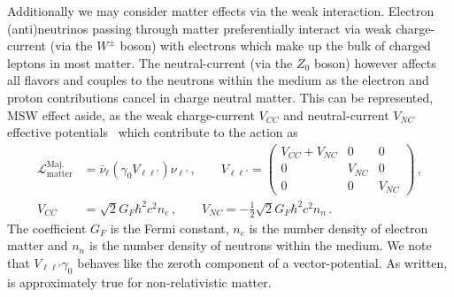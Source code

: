 Additionally we may consider matter effects via the weak interaction. Electron (anti)neutrinos passing through matter preferentially interact via weak charge-current (via the $W^{\pm}$ boson) with electrons which make up the bulk of charged leptons in most matter. The neutral-current (via the $Z_{0}$ boson) however affects all flavors and couples to the neutrons within the medium as the electron and proton contributions cancel in charge neutral matter. This can be represented, MSW effect aside, as the weak charge-current $V_{CC}$ and neutral-current $V_{NC}$ effective potentials~\citep{Pal:1991pm,greiner2009gauge} which contribute to the action as
\begin{align}
\label{matter:1}
\mathcal{L}_\mathrm{matter}^\mathrm{Maj.} &= \bar\nu_{\ell}(\gamma_{0}V_{\ell\ell'})\nu_{\ell'}\,,\qquad
V_{\ell\ell'} = 
\begin{pmatrix}
V_{CC}+V_{NC} & 0 & 0\\
0 & V_{NC} & 0\\
0 & 0 & V_{NC}
\end{pmatrix}\,,\\
V_{CC} &= \sqrt{2}G_{F}\hbar^{2}c^{2}n_{e}\,,\qquad V_{NC} = -\frac{1}{2}\sqrt{2}G_{F}\hbar^{2}c^{2}n_{n}\,.
\end{align}
The coefficient $G_{F}$ is the Fermi constant, $n_{e}$ is the number density of electron matter and $n_{n}$ is the number density of neutrons within the medium. We note that $V_{\ell\ell'}\gamma_{0}$ behaves like the zeroth component of a vector-potential. As written,  is approximately true for non-relativistic matter.


